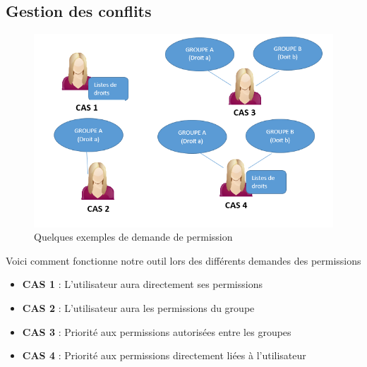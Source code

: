 \subsection{Gestion des conflits}
\begin{figure}[htbp]
	\centering
	\includegraphics[scale=0.7]{Images/conflitsDroits.png}
	\caption{Quelques exemples de demande de permission }
	\label{conflitsDroits}
\end{figure}

Voici comment fonctionne notre outil lors des différents demandes des permissions
\begin{itemize}
\item \textbf{CAS 1 } : L'utilisateur aura directement ses permissions
\item \textbf{CAS 2 } : L'utilisateur aura les permissions du groupe
\item \textbf{CAS 3 } : Priorité aux permissions autorisées entre les groupes
\item \textbf{CAS 4 } : Priorité aux permissions directement liées à l'utilisateur
\end{itemize}
